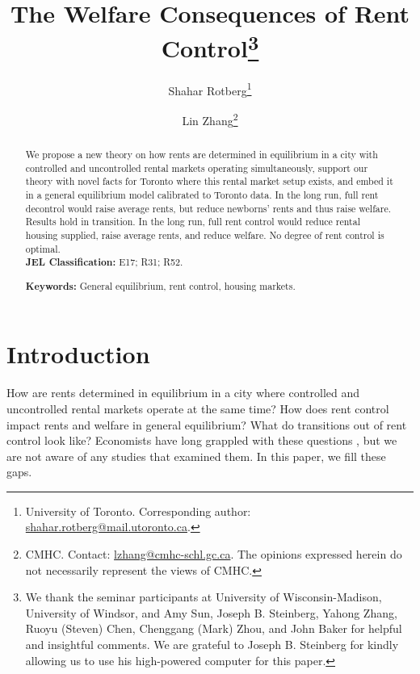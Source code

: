 \documentclass[parskip=full]{article}
\author{Shahar Rotberg\footnote{University of Toronto. Corresponding author: \url{shahar.rotberg@mail.utoronto.ca}.} \and Lin Zhang\footnote{CMHC. Contact: \url{lzhang@cmhc-schl.gc.ca}. The opinions expressed herein do not necessarily represent the views of CMHC.}}
\title{\vspace{-1.8cm}The Welfare Consequences of Rent Control\footnote{We thank the seminar participants at University of Wisconsin-Madison, University of Windsor, and Amy Sun, Joseph B. Steinberg, Yahong Zhang, Ruoyu (Steven) Chen, Chenggang (Mark) Zhou, and John Baker for helpful and insightful comments. We are grateful to Joseph B. Steinberg for kindly allowing us to use his high-powered computer for this paper.}}
\begin{document}
\maketitle

\begin{abstract}
\onehalfspacing
\noindent We propose a new theory on how rents are determined in equilibrium in a city with controlled and uncontrolled rental markets operating simultaneously, support our theory with novel facts for Toronto where this rental market setup exists, and embed it in a general equilibrium model calibrated to Toronto data. In the long run, full rent decontrol would raise average rents, but reduce newborns' rents and thus raise welfare. Results hold in transition. In the long run, full rent control would reduce rental housing supplied, raise average rents, and reduce welfare. No degree of rent control is optimal. 
\\[1.5ex]

\noindent \textbf{JEL Classification:} E17; R31; R52. 

\noindent \textbf{Keywords:} General equilibrium, rent control, housing markets.
\end{abstract}

\section{Introduction}

How are rents determined in equilibrium in a city where controlled and uncontrolled rental markets operate at the same time? How does rent control impact rents and welfare in general equilibrium? What do transitions out of rent control look like? Economists have long grappled with these questions \citep{fraser-1981,arnott-1995, diamond-2019}, but we are not aware of any studies that examined them. In this paper, we fill these gaps.
\end{document}
